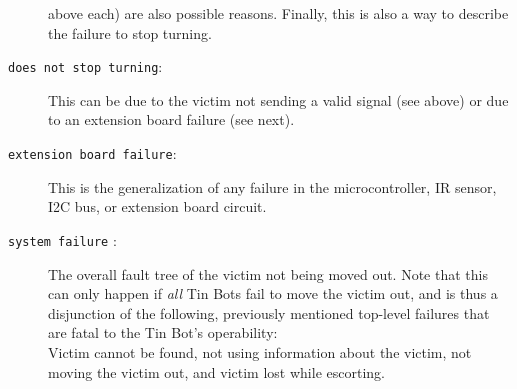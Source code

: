 \documentclass[a4paper,parskip,headheight=38pt]{scrartcl} %
\begin{document}
\begin{description}
    above each) are also possible reasons. Finally, this is also a way
    to describe the failure to stop turning.
\item[\texttt{does not stop turning}:]
    This can be due to the victim not sending a valid signal (see
    above) or due to an extension board failure (see next).
\item[\texttt{extension board failure}:]
    This is the generalization of any failure in the microcontroller,
    IR sensor, I2C bus, or extension board circuit.
\item[\texttt{system failure} \refpdf{systemfailure}:]
    The overall fault tree of the victim not being moved out.  Note
    that this can only happen if \emph{all} Tin Bots fail to move the
    victim out, and is thus a disjunction of the following, previously
    mentioned top-level failures that are fatal to the Tin Bot's
    operability:
     \\
    Victim cannot be found, not using information
    about the victim, not moving the victim out, and
    victim lost while escorting.
\end{description}
\end{document}
